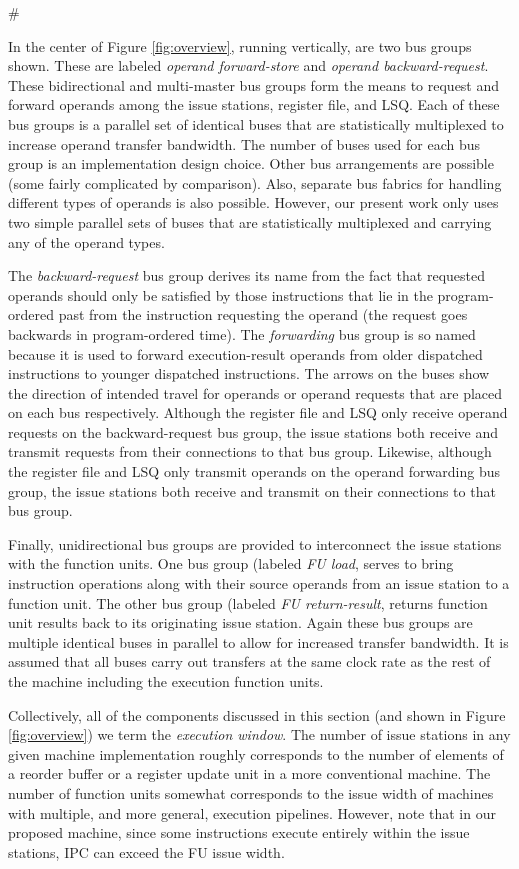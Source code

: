 #\documentclass[10pt,dvips]{article}
\begin{document}
In the center of Figure \ref{fig:overview},
running vertically, are two bus groups shown.
These are labeled \textit{operand forward-store} and
\textit{operand backward-request}.
These bidirectional and multi-master bus groups
form the means to request and forward operands
among the issue stations, register file, and LSQ.
Each of these bus groups is a parallel set of identical buses
that are statistically multiplexed to increase operand transfer
bandwidth.  The number of buses used for each bus group is
an implementation design choice.
Other bus arrangements are possible (some fairly complicated by
comparison).  
Also, separate bus fabrics for handling
different types of operands is also possible.
However, our present work only uses two simple parallel
sets of buses that are statistically multiplexed and carrying
any of the operand types.

The \textit{backward-request} bus group
derives its name from the fact that requested operands should
only be satisfied by those instructions that lie in the program-ordered
past from the instruction requesting the operand (the request goes
backwards in program-ordered time).
The \textit{forwarding} bus group is so named because it is used
to forward execution-result operands from older dispatched
instructions to younger dispatched instructions.
The arrows on the buses show the direction of intended travel
for operands or operand requests that are placed on each bus
respectively.  Although the register file and LSQ only receive
operand requests on the backward-request bus group, the issue stations
both receive and transmit requests from their connections to that
bus group.  Likewise, although the register file and LSQ only transmit
operands on the operand forwarding bus group, the issue stations
both receive and transmit on their connections to that bus group.

Finally, unidirectional bus groups are provided to interconnect
the issue stations with the function units.
One bus group (labeled \textit{FU load}, serves to bring instruction
operations along with their source operands from an issue
station to a function unit.
The other bus group (labeled \textit{FU return-result},
returns function unit results back to its
originating issue station.
Again these bus groups are multiple identical buses in
parallel to allow for increased transfer bandwidth.
It is assumed that all buses carry out transfers at the same
clock rate as the rest of the machine including the execution
function units.

Collectively, all of the components discussed in this section
(and shown in 
Figure \ref{fig:overview}) we term the \textit{execution window}.
The number of issue stations in
any given machine implementation roughly corresponds to the
number of elements of a reorder buffer or a register update unit
in a more conventional machine.
The number of function units somewhat corresponds to the
issue width of machines with multiple, and more general, execution pipelines.
However, note that in our proposed machine, since some instructions
execute entirely within the issue stations, IPC can exceed the FU
issue width.
%
\end{document}
